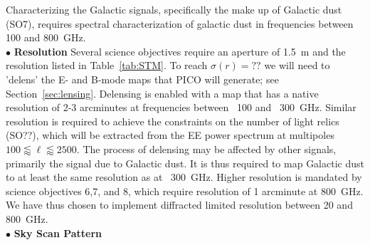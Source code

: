 \documentclass[PICOReport.tex]{subfiles}
\begin{document}
Characterizing the Galactic signals, specifically the make up of Galactic dust (SO7), requires spectral characterization 
of galactic dust in frequencies between 100 and 800~GHz.  \\
%
$\bullet$ {\bf Resolution} \hspace{0.1in} 
Several science objectives require an aperture of 1.5~m and the resolution listed in Table~\ref{tab:STM}. To reach 
$\sigma(r) = ??$ we will need to 'delens' the E- and B-mode maps that PICO will generate; see Section~\ref{sec:lensing}. 
Delensing is enabled with a map that has a native resolution of 2-3 arcminutes at frequencies between ~100 and ~300~GHz. 
Similar resolution is required to achieve the constraints on the number of light relics (SO??), which will be extracted from the 
EE power spectrum at multipoles $100 \lessapprox \ell \lessapprox 2500$.  
The process of delensing may be affected by other signals, primarily the signal due to Galactic dust. It is thus required to 
map Galactic dust to at least the same resolution as at ~300~GHz. Higher resolution is mandated by science objectives 
6,7, and 8, which require resolution of 1 arcminute at 800~GHz.  We have thus chosen to implement diffracted limited 
resolution between 20 and 800~GHz. \\
%
$\bullet$ {\bf Sky Scan Pattern} \hspace{0.1in} 

 
\end{document}
